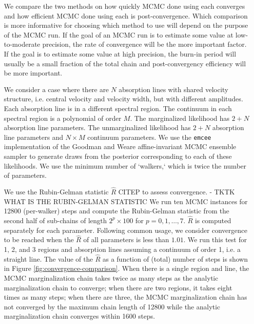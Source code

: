 \documentclass[manuscript]{aastex62}
\begin{document}
We compare the two methods on how quickly MCMC done using each converges and how efficient MCMC done using each is post-convergence.
Which comparison is more informative for choosing which method to use will depend on the purpose of the MCMC run.
If the goal of an MCMC run is to estimate some value at low-to-moderate precision, the rate of convergence will be the more important factor.
If the goal is to estimate some value at high precision, the burn-in period will usually be a small fraction of the total chain and post-convergency efficiency will be more important.

We consider a case where there are $N$ absorption lines with shared velocity structure, i.e. central velocity and velocity width, but with different amplitudes.
Each absorption line is in a different spectral region.
The continuum in each spectral region is a polynomial of order $M$.
The marginalized likelihood has $2 + N$ absorption line parameters.
The unmarginalized likelihood has $2 + N$ absorption line parameters and $N \times M$ continuum parameters.
We use the \texttt{emcee} implementation of the Goodman and Weare affine-invariant MCMC ensemble sampler to generate draws from the posterior corresponding to each of these likelihoods.
We use the minimum number of `walkers,` which is twice the number of parameters.

We use the Rubin-Gelman statistic $\hat{R}$ CITEP to assess convergence.
- TKTK WHAT IS THE RUBIN-GELMAN STATISTIC
We run ten MCMC instances for 12800 (per-walker) steps and compute the Rubin-Gelman statistic from the second half of sub-chains of length $2^p \times 100$ for $p=0, 1, \ldots, 7$.
$\hat{R}$ is computed separately for each parameter.
Following common usage, we consider convergence to be reached when the $\hat{R}$ of all parameters is less than $1.01$.
We run this test for 1, 2, and 3 regions and absorption lines assuming a continuum of order 1, i.e. a straight line.
The value of the $\hat{R}$ as a function of (total) number of steps is shown in Figure \ref{fig:convergence-comparison}.
When there is a single region and line, the MCMC marginalization chain takes twice as many steps as the analytic marginalization chain to converge; when there are two regions, it takes eight times as many steps; when there are three, the MCMC marginalization chain has not converged by the maximum chain length of 12800 while the analytic marginalization chain converges within 1600 steps.
\end{document}

